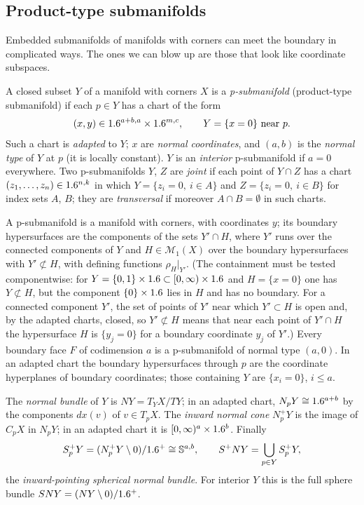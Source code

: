 \subsection{Product-type submanifolds}
Embedded submanifolds of manifolds with corners can meet the boundary in complicated
ways. The ones we can blow up are those that look like coordinate subspaces.

\begin{definition}\label{blowup:def:psub}
A closed subset $Y$ of a manifold with corners $X$ is a \emph{p-submanifold}
(product-type submanifold) if each $p\in Y$ has a chart of the form
\begin{equation}\label{blowup:eq:adapted}
  (x,y)\in\R^{a+b,a}\times\R^{m,c},\qquad Y=\{x=0\}\ \text{near}\ p.
\end{equation}
Such a chart is \emph{adapted} to $Y$; $x$ are \emph{normal coordinates}, and $(a,b)$ is
the \emph{normal type} of $Y$ at $p$ (it is locally constant). $Y$ is an \emph{interior}
p-submanifold if $a=0$ everywhere. Two p-submanifolds $Y$, $Z$ are \emph{joint} if each
point of $Y\cap Z$ has a chart $(z_1,\dots,z_n)\in1.6^{n,k}$ in which
$Y=\{z_i=0,\ i\in A\}$ and $Z=\{z_i=0,\ i\in B\}$ for index sets $A$, $B$; they are
\emph{transversal} if moreover $A\cap B=\emptyset$ in such charts.
\end{definition}

A p-submanifold is a manifold with corners, with coordinates $y$; its boundary
hypersurfaces are the components of the sets $Y'\cap H$, where $Y'$ runs over the
connected components of $Y$ and $H\in\mathcal M_1(X)$ over the boundary hypersurfaces with
$Y'\not\subset H$, with defining functions $\rho_H|_{Y'}$. (The containment must be tested
componentwise: for $Y=\{0,1\}\times1.6\subset[0,\infty)\times1.6$ and $H=\{x=0\}$ one has
$Y\not\subset H$, but the component $\{0\}\times1.6$ lies in $H$ and has no boundary. For a
connected component $Y'$, the set of points of $Y'$ near which $Y'\subset H$ is open and,
by the adapted charts, closed, so $Y'\not\subset H$ means that near each point of
$Y'\cap H$ the hypersurface $H$ is $\{y_j=0\}$ for a boundary coordinate $y_j$ of $Y'$.) Every boundary face $F$ of codimension $a$ is a
p-submanifold of normal type $(a,0)$. In an adapted chart the boundary hypersurfaces
through $p$ are the coordinate hyperplanes of boundary coordinates; those containing
$Y$ are $\{x_i=0\}$, $i\le a$.

The \emph{normal bundle} of $Y$ is $NY=T_YX/TY$; in an adapted chart, $N_pY\cong1.6^{a+b}$
by the components $dx(v)$ of $v\in T_pX$. The \emph{inward normal cone} $N^+_pY$ is the
image of $C_pX$ in $N_pY$; in an adapted chart it is $[0,\infty)^a\times1.6^b$. Finally
\begin{equation*}
  S^+_pY=(N^+_pY\setminus0)/1.6^+\cong\mathbb{S}^{a,b},\qquad S^+NY=\bigcup_{p\in Y}S^+_pY,
\end{equation*}
the \emph{inward-pointing spherical normal bundle}. For interior $Y$ this is the full
sphere bundle $SNY=(NY\setminus0)/1.6^+$.

